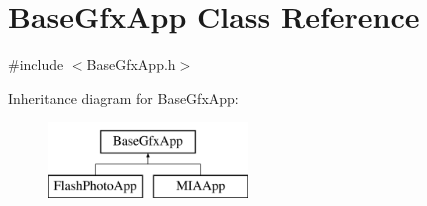 \hypertarget{classBaseGfxApp}{}\section{Base\+Gfx\+App Class Reference}
\label{classBaseGfxApp}


{\ttfamily \#include $<$Base\+Gfx\+App.\+h$>$}

Inheritance diagram for Base\+Gfx\+App\+:\begin{figure}[H]
\begin{center}
\leavevmode
\includegraphics[height=2.000000cm]{classBaseGfxApp}
\end{center}
\end{figure}
